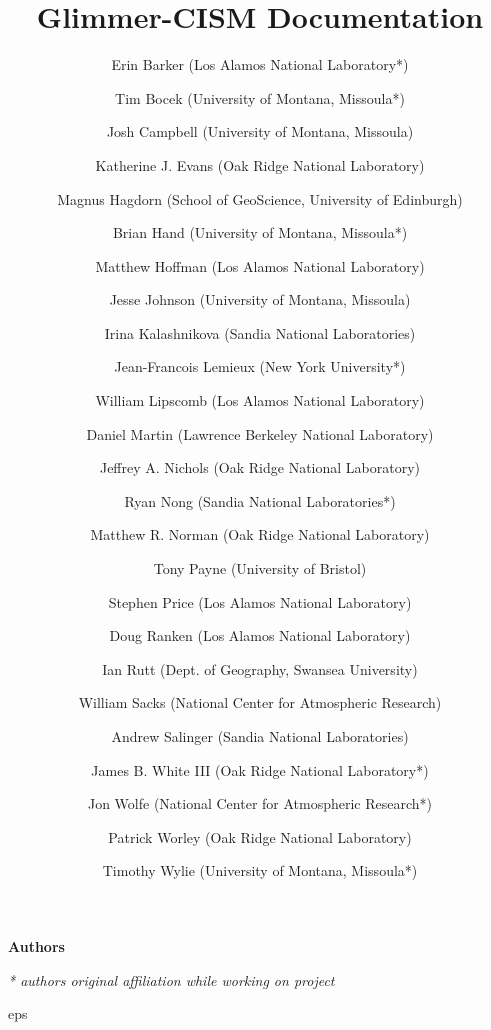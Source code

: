 

\frontmatter

\title{Glimmer-CISM {\glimmerver} Documentation}
\maketitle

\begin{center}
\textbf{Authors}
\end{center}

\author{Erin Barker (Los Alamos National Laboratory*)}
\author{Tim Bocek  (University of Montana, Missoula*)}
\author{Josh Campbell  (University of Montana, Missoula)}
\author{Katherine J. Evans (Oak Ridge National Laboratory)}
\author{Magnus Hagdorn (School of GeoScience, University of Edinburgh)}
\author{Brian Hand (University of Montana, Missoula*)}
\author{Matthew Hoffman (Los Alamos National Laboratory)}
\author{Jesse Johnson (University of Montana, Missoula)}
\author{Irina Kalashnikova (Sandia National Laboratories)}
\author{Jean-Francois Lemieux (New York University*)}
\author{William Lipscomb (Los Alamos National Laboratory)}
\author{Daniel Martin (Lawrence Berkeley National Laboratory)}
\author{Jeffrey A. Nichols (Oak Ridge National Laboratory)}
\author{Ryan Nong (Sandia National Laboratories*)}
\author{Matthew R. Norman (Oak Ridge National Laboratory)}
\author{Tony Payne (University of Bristol)}
\author{Stephen Price (Los Alamos National Laboratory)}
\author{Doug Ranken (Los Alamos National Laboratory)}
\author{Ian Rutt (Dept. of Geography, Swansea University)}
\author{William Sacks (National Center for Atmospheric Research)}
\author{Andrew Salinger (Sandia National Laboratories)}
\author{James B. White III (Oak Ridge National Laboratory*)}
\author{Jon Wolfe (National Center for Atmospheric Research*)}
\author{Patrick Worley (Oak Ridge National Laboratory)}
\author{Timothy Wylie (University of Montana, Missoula*)}

\textit{* authors original affiliation while working on project}


\tableofcontents

{
         {eps} 
         {%
         } 

}
{}

